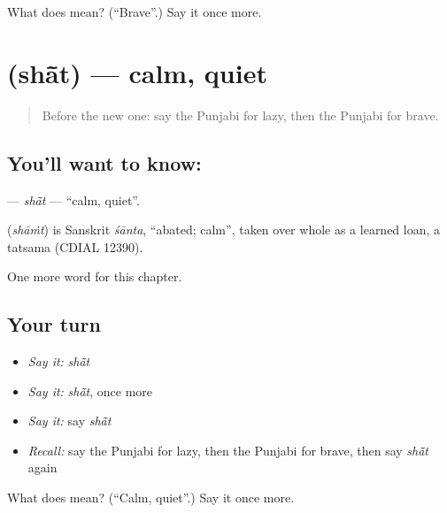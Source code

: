 \begin{tcolorbox}[breakable,colback=teal!4,colframe=teal!35!black,title={Before you move on}]
What does  mean? (\textquotedblleft{}Brave\textquotedblright{}.) Say it once more.
\end{tcolorbox}
\section[\texorpdfstring{\pa{ਸ਼ਾਂਤ} (shā̃t)}{ਸ਼ਾਂਤ (shā̃t)}]{ (shā̃t) — calm, quiet}

\label{lesson:PA-C145-shat}



\begin{quote}
Before the new one: say the Punjabi for lazy, then the Punjabi for brave.
\end{quote}

\subsection*{You'll want to know: }
\textbf{} — \emph{shā̃t} — \textquotedblleft{}calm, quiet\textquotedblright{}.

\begin{cousinweb}
\textbf{} (\emph{shāṁt}) is Sanskrit \emph{śānta}, \textquotedblleft{}abated; calm\textquotedblright{}, taken over whole as a learned loan, a tatsama (CDIAL 12390).
\end{cousinweb}

\begin{grammarlens}[title={What you've built}]
One more word for this chapter.
\end{grammarlens}

\subsection*{Your turn}
\begin{itemize}
\raggedright
  \item \emph{Say it:} \emph{shā̃t}
  \item \emph{Say it:} \emph{shā̃t}, once more
  \item \emph{Say it:} say \emph{shā̃t}
  \item \emph{Recall:} say the Punjabi for lazy, then the Punjabi for brave, then say \emph{shā̃t} again
\end{itemize}

\begin{tcolorbox}[breakable,colback=teal!4,colframe=teal!35!black,title={Before you move on}]
What does  mean? (\textquotedblleft{}Calm, quiet\textquotedblright{}.) Say it once more.
\end{tcolorbox}
